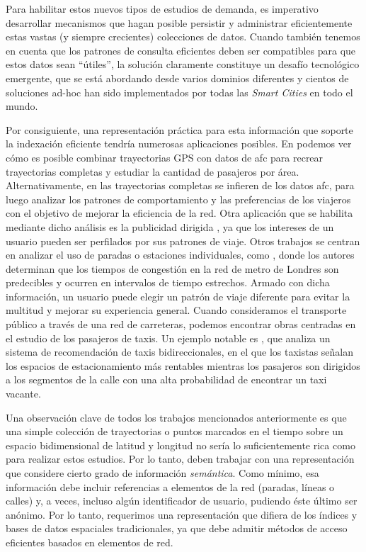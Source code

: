     Para habilitar estos nuevos tipos de estudios de demanda, es imperativo desarrollar mecanismos que hagan posible persistir y administrar eficientemente estas vastas (y siempre crecientes) colecciones de datos. Cuando tambi\'en tenemos en cuenta que los patrones de consulta eficientes deben ser compatibles para que estos datos sean ``\'utiles'', la soluci\'on claramente constituye un desaf\'io tecnol\'ogico emergente, que se est\'a abordando desde varios dominios diferentes y cientos de soluciones ad-hoc han sido implementados por todas las \textit{Smart Cities} en todo el mundo.
    
    Por consiguiente, una representaci\'on pr\'actica para esta informaci\'on que soporte la indexaci\'on eficiente tendr\'ia numerosas aplicaciones posibles. En \cite{tu2018spatial} podemos ver c\'omo es posible combinar trayectorias GPS con datos de \gls{afc} para recrear trayectorias completas y estudiar la cantidad de pasajeros por \'area. Alternativamente, en \cite{weng2018mining} las trayectorias completas se infieren de los datos \gls{afc}, para luego analizar los patrones de comportamiento y las preferencias de los viajeros con el objetivo de mejorar la eficiencia de la red. Otra aplicaci\'on que se habilita mediante dicho an\'alisis es la publicidad dirigida \cite{zhang2017targeted}, ya que los intereses de un usuario pueden ser perfilados por sus patrones de viaje. Otros trabajos se centran en analizar el uso de paradas o estaciones individuales, como \cite{ceapa2012avoiding}, donde los autores determinan que los tiempos de congesti\'on en la red de metro de Londres son predecibles y ocurren en intervalos de tiempo estrechos. Armado con dicha informaci\'on, un usuario puede elegir un patr\'on de viaje diferente para evitar la multitud y mejorar su experiencia general. Cuando consideramos el transporte p\'ublico a trav\'es de una red de carreteras, podemos encontrar obras centradas en el estudio de los pasajeros de taxis. Un ejemplo notable es \cite{yuan2013t}, que analiza un sistema de recomendaci\'on de taxis bidireccionales, en el que los taxistas se\~nalan los espacios de estacionamiento m\'as rentables mientras los pasajeros son dirigidos a los segmentos de la calle con una alta probabilidad de encontrar un taxi vacante.
    
    Una observaci\'on clave de todos los trabajos mencionados anteriormente es que una simple colecci\'on de trayectorias o puntos marcados en el tiempo sobre un espacio bidimensional de latitud y longitud no ser\'ia lo suficientemente rica como para realizar estos estudios. Por lo tanto, deben trabajar con una representaci\'on que considere cierto grado de informaci\'on \textit{sem\'antica}. Como m\'inimo, esa informaci\'on debe incluir referencias a elementos de la red (paradas, l\'ineas o calles) y, a veces, incluso alg\'un identificador de usuario, pudiendo \'este \'ultimo ser an\'onimo. Por lo tanto, requerimos una representaci\'on que difiera de los \'indices y bases de datos espaciales tradicionales, ya que debe admitir m\'etodos de acceso eficientes basados en elementos de red.


